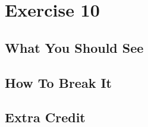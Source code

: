 \chapter{Exercise 10}


\section{What You Should See}


\section{How To Break It}


\section{Extra Credit}




